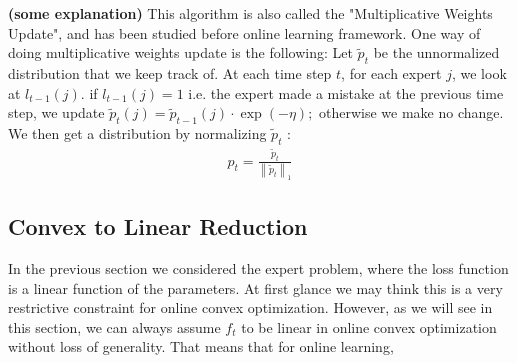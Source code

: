 \documentclass{article}
\newcommand{\bfs}[1]{\textbf{({#1}) }}
\begin{document}
\begin{rema}\bfs{some explanation}
 This algorithm is also called the "Multiplicative Weights Update", and has been studied before online learning framework. One way of doing multiplicative weights update is the following: Let $\tilde{p}_{t}$ be the unnormalized distribution that we keep track of. At each time step $t$, for each expert $j$, we look at $l_{t-1}(j)$. if $l_{t-1}(j)=1$ i.e. the expert made a mistake at the previous time step, we update $\tilde{p}_{t}(j)=\tilde{p}_{t-1}(j) \cdot \exp (-\eta) ;$ otherwise we make no change. We then get a distribution by normalizing $\tilde{p}_{t}$ :
\begin{align*}
p_{t}=\frac{\tilde{p}_{t}}{\left\|\tilde{p}_{t}\right\|_{1}}
\end{align*}
\end{rema}

\subsection{Convex to Linear Reduction}
In the previous section we considered the expert problem, where the loss function is a linear function of the parameters. At first glance we may think this is a very restrictive constraint for online convex optimization. However, as we will see in this section, we can always assume $f_{t}$ to be linear in online convex optimization without loss of generality. That means that for online learning, 
\end{document}
